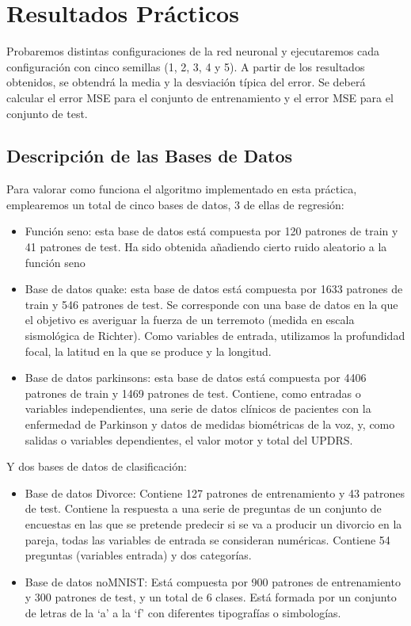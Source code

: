 \section{Resultados Prácticos}

Probaremos distintas configuraciones de la red neuronal y ejecutaremos cada configuración con cinco semillas (1, 2, 3, 4 y 5). A partir de los resultados obtenidos, se obtendrá la media y la desviación típica del error. Se deberá calcular el error MSE para el conjunto de entrenamiento y el error MSE para el conjunto de test.

\subsection{Descripción de las Bases de Datos}
Para valorar como funciona el algoritmo implementado en esta práctica, emplearemos un total de cinco bases de datos, 3 de ellas de regresión:
\begin{itemize}
\item Función seno: esta base de datos está compuesta por 120 patrones de train y 41 patrones de test. Ha sido obtenida a\~{n}adiendo cierto ruido aleatorio a la función seno
\item Base de datos quake: esta base de datos está compuesta por 1633 patrones de train y 546 patrones de test. Se corresponde con una base de datos en la que el objetivo es averiguar la fuerza de un terremoto (medida en escala sismológica de Richter). Como variables de entrada, utilizamos la profundidad focal, la latitud en la que se produce y la longitud.
\item Base de datos parkinsons: esta base de datos está compuesta por 4406 patrones de train y 1469 patrones de test. Contiene, como entradas o variables independientes, una serie de datos clínicos de pacientes con la enfermedad de Parkinson y datos de medidas biométricas de la voz, y, como salidas o variables dependientes, el valor motor y total del UPDRS.
\end{itemize}

Y dos bases de datos de clasificación:
\begin{itemize}
	\item Base de datos Divorce: Contiene 127 patrones de entrenamiento y 43 patrones de test. Contiene la respuesta a una serie de preguntas de un conjunto de encuestas en las que se pretende predecir si se va a producir un divorcio en la pareja, todas las variables de entrada se consideran numéricas. Contiene 54 preguntas (variables entrada) y dos categorías.
	\item Base de datos noMNIST: Está compuesta por 900 patrones de entrenamiento y 300 patrones de test, y un total de 6 clases. Está formada por un conjunto de letras de la `a' a la `f' con diferentes tipografías o simbologías.
\end{itemize}

